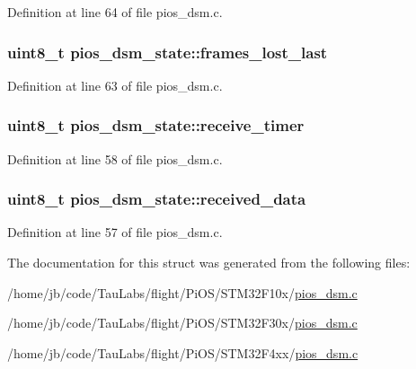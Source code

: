 \-Definition at line 64 of file pios\-\_\-dsm.\-c.

\hypertarget{structpios__dsm__state_a427f6b8b7743f180403285623f71260e}{
\subsubsection[{frames\-\_\-lost\-\_\-last}]{\setlength{\rightskip}{0pt plus 5cm}uint8\-\_\-t {\bf pios\-\_\-dsm\-\_\-state\-::frames\-\_\-lost\-\_\-last}}}\label{structpios__dsm__state_a427f6b8b7743f180403285623f71260e}


\-Definition at line 63 of file pios\-\_\-dsm.\-c.

\hypertarget{structpios__dsm__state_af7296b9f7aa4be7e56a8edd0025c5fab}{
\subsubsection[{receive\-\_\-timer}]{\setlength{\rightskip}{0pt plus 5cm}uint8\-\_\-t {\bf pios\-\_\-dsm\-\_\-state\-::receive\-\_\-timer}}}\label{structpios__dsm__state_af7296b9f7aa4be7e56a8edd0025c5fab}


\-Definition at line 58 of file pios\-\_\-dsm.\-c.

\hypertarget{structpios__dsm__state_af4caef811fdc9b8381bedc715e92068e}{
\subsubsection[{received\-\_\-data}]{\setlength{\rightskip}{0pt plus 5cm}uint8\-\_\-t {\bf pios\-\_\-dsm\-\_\-state\-::received\-\_\-data}}}\label{structpios__dsm__state_af4caef811fdc9b8381bedc715e92068e}


\-Definition at line 57 of file pios\-\_\-dsm.\-c.



\-The documentation for this struct was generated from the following files\-:\begin{DoxyCompactItemize}
\item 
/home/jb/code/\-Tau\-Labs/flight/\-Pi\-O\-S/\-S\-T\-M32\-F10x/\hyperlink{_s_t_m32_f10x_2pios__dsm_8c}{pios\-\_\-dsm.\-c}\item 
/home/jb/code/\-Tau\-Labs/flight/\-Pi\-O\-S/\-S\-T\-M32\-F30x/\hyperlink{_s_t_m32_f30x_2pios__dsm_8c}{pios\-\_\-dsm.\-c}\item 
/home/jb/code/\-Tau\-Labs/flight/\-Pi\-O\-S/\-S\-T\-M32\-F4xx/\hyperlink{_s_t_m32_f4xx_2pios__dsm_8c}{pios\-\_\-dsm.\-c}\end{DoxyCompactItemize}
